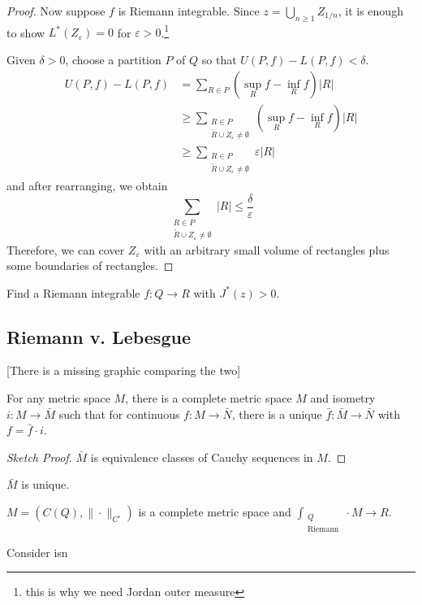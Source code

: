 \begin{proof}
  Now suppose $f$ is Riemann integrable. Since $z = \bigcup_{n \geq 1} Z_{1/n}$, it is enough to show $L^*(Z_\varepsilon) = 0$ for $\varepsilon > 0$.\footnote{this is why we need Jordan outer measure}

  Given $\delta > 0$, choose a partition $P$ of $Q$ so that $U(P,f) - L(P,f) < \delta$.
  \begin{align*}
    U(P,f) - L(P,f) & = \sum_{R \in P} \left( \sup_R f - \inf_R f \right) |R| \\
                    & \geq \sum_{\substack{R \in P \\ \mathring{R} \cup Z_\varepsilon \ne \emptyset}} \left( \sup_R f - \inf_R f \right) |R| \\
                    & \geq \sum_{\substack{R \in P \\ \mathring{R} \cup Z_\varepsilon \ne \emptyset}} \varepsilon |R|
  \end{align*}
  and after rearranging, we obtain
  \[ \sum_{\substack{R \in P \\ \mathring{R} \cup Z_\varepsilon \ne \emptyset}} |R| \leq \frac{\delta}{\varepsilon}\]
  Therefore, we can cover $Z_\varepsilon$ with an arbitrary small volume of rectangles plus some boundaries of rectangles.
\end{proof}

\begin{exercise}
  Find a Riemann integrable $f : Q \to R$ with $J^* (z) > 0$. 
\end{exercise}

\subsection{Riemann v. Lebesgue}

[There is a missing graphic comparing the two]

\begin{theorem}
  For any metric space $M$, there is a complete metric space $M$ and isometry $i : M \to \bar{M}$ such that for continuous $f : M \to \bar{N}$, there is a unique $\bar{f} : \bar{M} \to \bar{N}$ with $f = \bar{f} \cdot i$. 
\end{theorem}

\begin{proof}[Sketch Proof]
  $\bar{M}$ is equivalence classes of Cauchy sequences in $M$.
\end{proof}

\begin{corollary}
  $\bar{M}$ is unique. 
\end{corollary}

$M = (C(Q), \| \cdot \|_{C^\circ})$ is a complete metric space and $\int_{\substack{Q \\ \text{Riemann}}} \cdot M \to R$. 

Consider isn


